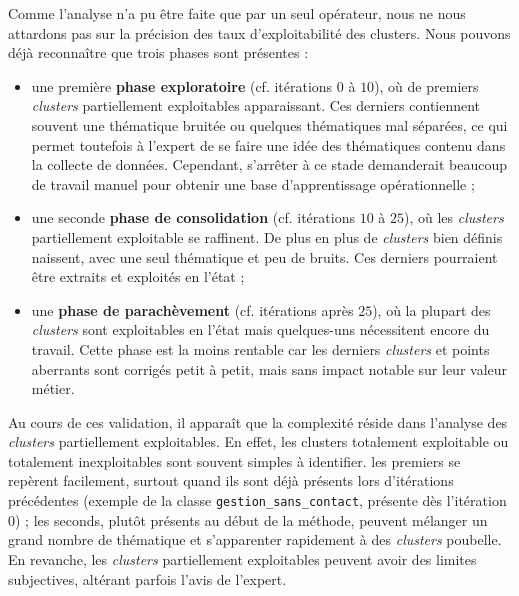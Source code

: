 			Comme l'analyse n'a pu être faite que par un seul opérateur, nous ne nous attardons pas sur la précision des taux d'exploitabilité des clusters.
			Nous pouvons déjà reconnaître que trois phases sont présentes :
			\begin{itemize}
				\item une première \textbf{phase exploratoire} (cf. itérations $0$ à $10$), où de premiers \textit{clusters} partiellement exploitables apparaissant.
				Ces derniers contiennent souvent une thématique bruitée ou quelques thématiques mal séparées, ce qui permet toutefois à l'expert de se faire une idée des thématiques contenu dans la collecte de données.
				Cependant, s'arrêter à ce stade demanderait beaucoup de travail manuel pour obtenir une base d'apprentissage opérationnelle ;
				\item une seconde \textbf{phase de consolidation} (cf. itérations $10$ à $25$), où les \textit{clusters} partiellement exploitable se raffinent.
				De plus en plus de \textit{clusters} bien définis naissent, avec une seul thématique et peu de bruits.
				Ces derniers pourraient être extraits et exploités en l'état ;
				\item une \textbf{phase de parachèvement} (cf. itérations après $25$), où la plupart des \textit{clusters} sont exploitables en l'état mais quelques-uns nécessitent encore du travail.
				Cette phase est la moins rentable car les derniers \textit{clusters} et points aberrants sont corrigés petit à petit, mais sans impact notable sur leur valeur métier. 
			\end{itemize}
			
			Au cours de ces validation, il apparaît que la complexité réside dans l'analyse des \textit{clusters} partiellement exploitables.
			En effet, les clusters totalement exploitable ou totalement inexploitables sont souvent simples à identifier.
			les premiers se repèrent facilement, surtout quand ils sont déjà présents lors d'itérations précédentes (exemple de la classe \texttt{gestion\_sans\_contact}, présente dès l'itération $0$) ;
			les seconds, plutôt présents au début de la méthode, peuvent mélanger un grand nombre de thématique et s'apparenter rapidement à des \textit{clusters} poubelle.
			En revanche, les \textit{clusters} partiellement exploitables peuvent avoir des limites subjectives, altérant parfois l'avis de l'expert.
			
